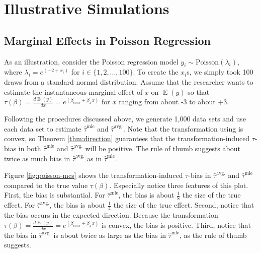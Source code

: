 \documentclass[10pt]{article}
\DeclareMathOperator*{\E}{\text{E}}
\begin{document}
\section*{Illustrative Simulations}

\subsection*{Marginal Effects in Poisson Regression}

As an illustration, consider the Poisson regression model $y_i \sim \text{Poisson}(\lambda_i)$, where $\lambda_i = e^{(-2 + x_i)}$ for $i \in \{1, 2, ..., 100\}$. 
To create the $x_i$s, we simply took 100 draws from a standard normal distribution. 
Assume that the researcher wants to estimate the instantaneous marginal effect of $x$ on $\E(y)$ so that $\tau(\beta) = \frac{d \E (y)}{dx} = e^{(\beta_{cons} + \beta_x x)}$ for $x$ ranging from about -3 to about +3.

Following the procedures discussed above, we generate 1,000 data sets and use each data set to estimate $\hat{\tau}^\text{mle}$ and $\hat{\tau}^\text{avg.}$. 
Note that the transformation using is convex, so Theorem \ref{thm:direction} guarantees that the transformation-induced $\tau$-bias in both $\hat{\tau}^\text{mle}$ and $\hat{\tau}^\text{avg.}$ will be positive. The rule of thumb suggests about twice as much bias in $\hat{\tau}^\text{avg.}$ as in $\hat{\tau}^\text{mle}$. 

Figure \ref{fig:poisson-mcs} shows the transformation-induced $\tau$-bias in $\hat{\tau}^\text{avg.}$ and $\hat{\tau}^\text{mle}$ compared to the true value $\tau(\beta)$. 
Especially notice three features of this plot. 
First, the bias is substantial. 
For $\hat{\tau}^\text{mle}$, the bias is about $\frac{1}{8}$ the size of the true effect. 
For $\hat{\tau}^\text{avg.}$, the bias is about $\frac{1}{4}$ the size of the true effect. 
Second, notice that the bias occurs in the expected direction. 
Because the transformation $\tau(\beta) = \frac{d \E (y)}{dx} = e^{(\beta_{cons} + \beta_x x)}$ is convex, the bias is positive. 
Third, notice that the bias in $\hat{\tau}^\text{avg.}$ is about twice as large as the bias in $\hat{\tau}^\text{mle}$, as the rule of thumb suggests.
\end{document}
